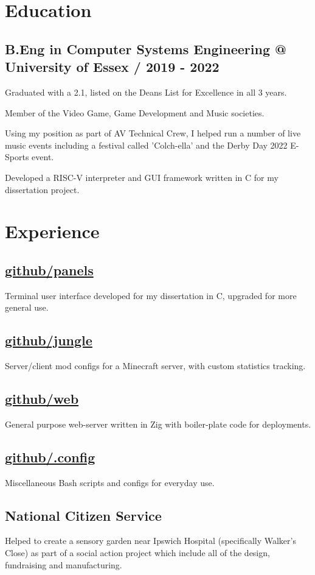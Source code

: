 \documentclass{article}
\newcommand{\github}{https://mskor.xyz/git/mskor}
\begin{document}
\section{Education}

\subsection{B.Eng in Computer Systems Engineering @ University of Essex / 2019 - 2022}
\begin{compactitem}
\item Graduated with a 2.1, listed on the Deans List for Excellence in all 3 years.
\item Member of the Video Game, Game Development and Music societies.
\item Using my position as part of AV Technical Crew, I helped run a number of live music events including a festival called 'Colch-ella' and the Derby Day 2022 E-Sports event.
\item Developed a RISC-V interpreter and GUI framework written in C for my dissertation project.
\end{compactitem}

\section{Experience}

\subsection{\href{\github/panels}{github/panels}} Terminal user interface developed for my dissertation in C, upgraded for more general use.
\subsection{\href{\github/jungle}{github/jungle}} Server/client mod configs for a Minecraft server, with custom statistics tracking.
\subsection{\href{\github/web}{github/web}} General purpose web-server written in Zig with boiler-plate code for deployments.
\subsection{\href{\github/.config}{github/.config}} Miscellaneous Bash scripts and configs for everyday use.  
\subsection{National Citizen Service} Helped to create a sensory garden near Ipswich Hospital (specifically Walker's Close) as part of a social action project which include all of the design, fundraising and manufacturing.
\end{document}
